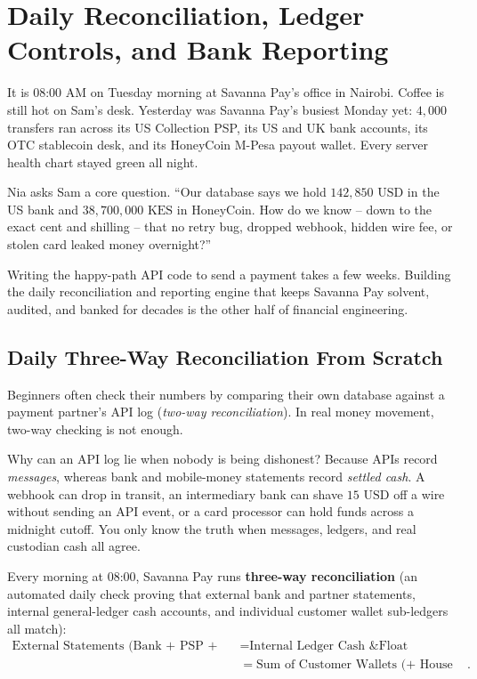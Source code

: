 \chapter{Daily Reconciliation, Ledger Controls, and Bank Reporting}
\label{ch:reconciliation-and-reporting}
\chapterline

It is 08:00 AM on Tuesday morning at Savanna Pay's office in Nairobi. Coffee is still hot on Sam's desk. Yesterday was Savanna Pay's busiest Monday yet: $4{,}000$ transfers ran across its US Collection PSP, its US and UK bank accounts, its OTC stablecoin desk, and its HoneyCoin M-Pesa payout wallet. Every server health chart stayed green all night.

Nia asks Sam a core question. ``Our database says we hold $142{,}850\text{ USD}$ in the US bank and $38{,}700{,}000\text{ KES}$ in HoneyCoin. How do we know -- down to the exact cent and shilling -- that no retry bug, dropped webhook, hidden wire fee, or stolen card leaked money overnight?''

Writing the happy-path API code to send a payment takes a few weeks. Building the daily reconciliation and reporting engine that keeps Savanna Pay solvent, audited, and banked for decades is the other half of financial engineering.

\section{Daily Three-Way Reconciliation From Scratch}

Beginners often check their numbers by comparing their own database against a payment partner's API log (\emph{two-way reconciliation}). In real money movement, two-way checking is not enough.

\begin{intuitionbox}
Why can an API log lie when nobody is being dishonest? Because APIs record \emph{messages}, whereas bank and mobile-money statements record \emph{settled cash}. A webhook can drop in transit, an intermediary bank can shave $15\text{ USD}$ off a wire without sending an API event, or a card processor can hold funds across a midnight cutoff. You only know the truth when messages, ledgers, and real custodian cash all agree.
\end{intuitionbox}



Every morning at 08:00, Savanna Pay runs \textbf{three-way reconciliation} (an automated daily check proving that external bank and partner statements, internal general-ledger cash accounts, and individual customer wallet sub-ledgers all match):
\begin{align*}
  \text{External Statements (Bank + PSP + HoneyCoin)}
    &= \text{Internal Ledger Cash \& Float} \\
    &= \text{Sum of Customer Wallets (+ House Equity)}.
\end{align*}

